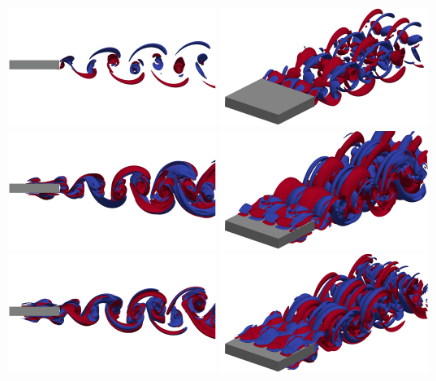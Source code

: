 \begin{figure}
  \centering
  \includegraphics[trim={0 250 0 200},clip,width=0.49\textwidth]{./fig/AR5p5/omegax_Re450_2D.png}
  \includegraphics[trim={10 0 10 0},clip,width=0.49\textwidth]{./fig/AR5p5/omegax_Re450_3D.png} 
  \includegraphics[trim={0 250 0 200},clip,width=0.49\textwidth]{./fig/AR5p5/omegax_Re500_2D.png}
  \includegraphics[trim={10 0 10 0},clip,width=0.49\textwidth]{./fig/AR5p5/omegax_Re500_3D.png} 
  \includegraphics[trim={0 250 0 200},clip,width=0.49\textwidth]{./fig/AR5p5/omegax_Re550_2D.png}
  \includegraphics[trim={10 0 10 0},clip,width=0.49\textwidth]{./fig/AR5p5/omegax_Re550_3D.png}  

\end{figure}

